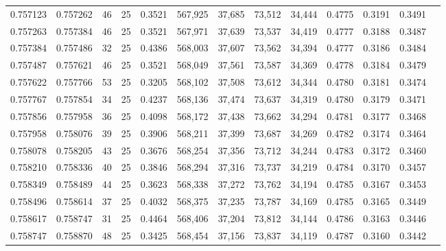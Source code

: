 \begin{tabular}{rrrrrrrrrrrrr}
0.757123 & 0.757262 &    46 &  25 &                                     0.3521 & 567,925 &  37,685 &  73,512 &  34,444 & 0.4775 & 0.3191 & 0.3491 \\
0.757263 & 0.757384 &    46 &  25 &                                     0.3521 & 567,971 &  37,639 &  73,537 &  34,419 & 0.4777 & 0.3188 & 0.3487 \\
0.757384 & 0.757486 &    32 &  25 &                                     0.4386 & 568,003 &  37,607 &  73,562 &  34,394 & 0.4777 & 0.3186 & 0.3484 \\
0.757487 & 0.757621 &    46 &  25 &                                     0.3521 & 568,049 &  37,561 &  73,587 &  34,369 & 0.4778 & 0.3184 & 0.3479 \\
0.757622 & 0.757766 &    53 &  25 &                                     0.3205 & 568,102 &  37,508 &  73,612 &  34,344 & 0.4780 & 0.3181 & 0.3474 \\
0.757767 & 0.757854 &    34 &  25 &                                     0.4237 & 568,136 &  37,474 &  73,637 &  34,319 & 0.4780 & 0.3179 & 0.3471 \\
0.757856 & 0.757958 &    36 &  25 &                                     0.4098 & 568,172 &  37,438 &  73,662 &  34,294 & 0.4781 & 0.3177 & 0.3468 \\
0.757958 & 0.758076 &    39 &  25 &                                     0.3906 & 568,211 &  37,399 &  73,687 &  34,269 & 0.4782 & 0.3174 & 0.3464 \\
0.758078 & 0.758205 &    43 &  25 &                                     0.3676 & 568,254 &  37,356 &  73,712 &  34,244 & 0.4783 & 0.3172 & 0.3460 \\
0.758210 & 0.758336 &    40 &  25 &                                     0.3846 & 568,294 &  37,316 &  73,737 &  34,219 & 0.4784 & 0.3170 & 0.3457 \\
0.758349 & 0.758489 &    44 &  25 &                                     0.3623 & 568,338 &  37,272 &  73,762 &  34,194 & 0.4785 & 0.3167 & 0.3453 \\
0.758496 & 0.758614 &    37 &  25 &                                     0.4032 & 568,375 &  37,235 &  73,787 &  34,169 & 0.4785 & 0.3165 & 0.3449 \\
0.758617 & 0.758747 &    31 &  25 &                                     0.4464 & 568,406 &  37,204 &  73,812 &  34,144 & 0.4786 & 0.3163 & 0.3446 \\
0.758747 & 0.758870 &    48 &  25 &                                     0.3425 & 568,454 &  37,156 &  73,837 &  34,119 & 0.4787 & 0.3160 & 0.3442 \\

\end{tabular}
